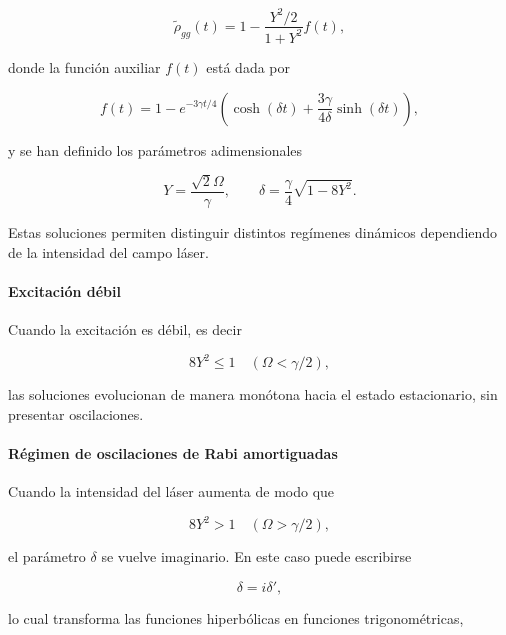 \documentclass[11pt]{report}
\begin{document}
\begin{equation}
\tilde{\rho}_{gg}(t)
=
1-\frac{Y^2/2}{1+Y^2}f(t),
\end{equation}

donde la función auxiliar $f(t)$ está dada por

\begin{equation}
f(t)=
1-
e^{-3\gamma t/4}
\left(
\cosh(\delta t)
+
\frac{3\gamma}{4\delta}\sinh(\delta t)
\right),
\end{equation}

y se han definido los parámetros adimensionales

\begin{equation}
Y=\frac{\sqrt{2}\Omega}{\gamma},
\qquad
\delta=
\frac{\gamma}{4}\sqrt{1-8Y^2}.
\end{equation}

Estas soluciones permiten distinguir distintos regímenes dinámicos dependiendo de la intensidad del campo láser.

\paragraph{Excitación débil}

Cuando la excitación es débil, es decir

\begin{equation}
8Y^2 \leq 1
\quad
(\Omega < \gamma/2),
\end{equation}

las soluciones evolucionan de manera monótona hacia el estado estacionario, sin presentar oscilaciones.

\paragraph{Régimen de oscilaciones de Rabi amortiguadas}

Cuando la intensidad del láser aumenta de modo que

\begin{equation}
8Y^2 > 1
\quad
(\Omega > \gamma/2),
\end{equation}

el parámetro $\delta$ se vuelve imaginario. En este caso puede escribirse

\begin{equation}
\delta = i\delta',
\end{equation}

lo cual transforma las funciones hiperbólicas en funciones trigonométricas,
\end{document}
